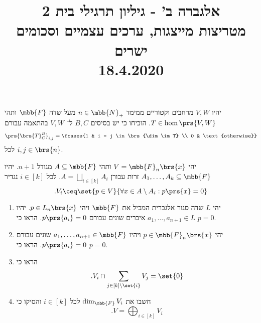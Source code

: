 \documentclass[a4paper,10pt,twoside,openany]{article}
\title{
אלגברה ב' - גיליון תרגילי בית 2 \\
מטריצות מייצגות, ערכים עצמיים וסכומים ישרים
\\
\small{18.4.2020}
}
\date{}
\begin{document}
\maketitle

\begin{exercise}
יהיו
$V,W$
מרחבים וקטוריים ממימד
$n \in \mbb{N}_+$
מעל שדה
$\mbb{F}$
ותהי
$T \in \hom\prs{V,W}$.
הוכיחו כי יש בסיסים
$B,C$
ל־%
$V,W$
בהתאמה עבורם
\[\prs{\brs{T}^B_C}_{i,j} = \fcases{1 & i = j \in \brs{\dim \im T} \\ 0 & \text{otherwise}}\]
לכל
$i,j \in \brs{n}$.
\end{exercise}

\begin{exercise}
יהי
$V = \mbb{F}_n\brs{x}$
ותהי
$A \subseteq \mbb{F}$
מגודל
$n+1$.
יהיו
$A_1, \ldots, A_k \subseteq \mbb{F}$
זרות עבורן
$A = \bigsqcup_{i \in [k]} A_i$.
לכל
$i \in [k]$
נגדיר
\[\text{.} V_i \ceq \set{p \in V}{\forall x \in A \setminus A_i : p\prs{x} = 0}\]

\begin{enumerate}
\item יהי
$L$
שדה סגור אלגברית המכיל את
$\mbb{F}$
ויהי
$p \in L_n\brs{x}$.
יהיו
$a_1, \ldots, a_{n+1} \in L$
איברים שונים עבורם
$p\prs{a_i} = 0$.
הראו כי
$p = 0$.

\item יהי
$p \in \mbb{F}_n\brs{x}$
ויהיו
$a_1, \ldots, a_{n+1} \in \mbb{F}$
שונים עבורם
$p\prs{a_i} = 0$.
הראו כי
$p = 0$.

\item הראו כי
\[\text{.} V_i \cap \sum_{j \in [k] \setminus \set{i}} V_j = \set{0}\]

\item חשבו את
$\dim_{\mbb{F}} V_i$
לכל
$i \in [k]$
והסיקו כי
\[\text{.} V = \bigoplus_{i \in [k]} V_i\]

\end{enumerate}

\end{exercise}
\end{document}
